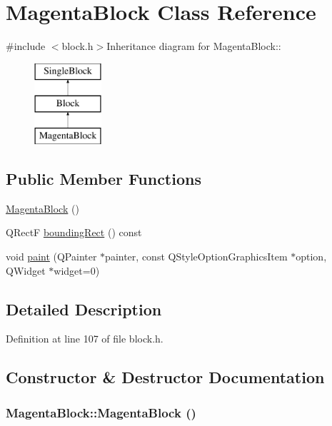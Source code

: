 \hypertarget{class_magenta_block}{
\section{MagentaBlock Class Reference}
\label{class_magenta_block}
}


{\ttfamily \#include $<$block.h$>$}Inheritance diagram for MagentaBlock::\begin{figure}[H]
\begin{center}
\leavevmode
\includegraphics[height=3cm]{class_magenta_block}
\end{center}
\end{figure}
\subsection*{Public Member Functions}
\begin{DoxyCompactItemize}
\item 
\hyperlink{class_magenta_block_aa9a37dccb15970e1e23a1e80b6d943d8}{MagentaBlock} ()
\item 
QRectF \hyperlink{class_magenta_block_aec892d6118a5a5030d767a5ccfc56929}{boundingRect} () const 
\item 
void \hyperlink{class_magenta_block_ac48f5303ee031233918abfa460dd7066}{paint} (QPainter $\ast$painter, const QStyleOptionGraphicsItem $\ast$option, QWidget $\ast$widget=0)
\end{DoxyCompactItemize}


\subsection{Detailed Description}


Definition at line 107 of file block.h.

\subsection{Constructor \& Destructor Documentation}
\hypertarget{class_magenta_block_aa9a37dccb15970e1e23a1e80b6d943d8}{
\subsubsection[{MagentaBlock}]{\setlength{\rightskip}{0pt plus 5cm}MagentaBlock::MagentaBlock ()}}
\label{class_magenta_block_aa9a37dccb15970e1e23a1e80b6d943d8}


